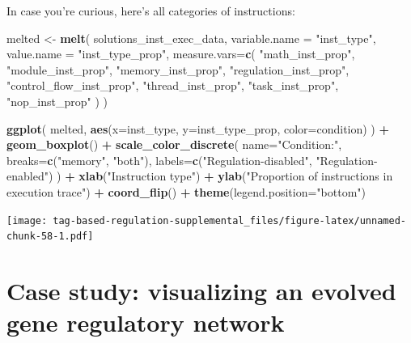 \documentclass[
]{book}
\newenvironment{Shaded}{\begin{snugshade}}{\end{snugshade}}
\newcommand{\DataTypeTok}[1]{\textcolor[rgb]{0.13,0.29,0.53}{#1}}
\newcommand{\KeywordTok}[1]{\textcolor[rgb]{0.13,0.29,0.53}{\textbf{#1}}}
\newcommand{\NormalTok}[1]{#1}
\newcommand{\OperatorTok}[1]{\textcolor[rgb]{0.81,0.36,0.00}{\textbf{#1}}}
\newcommand{\StringTok}[1]{\textcolor[rgb]{0.31,0.60,0.02}{#1}}
\begin{document}
In case you're curious, here's all categories of instructions:

\begin{Shaded}
\begin{Highlighting}[]
\NormalTok{melted \textless{}{-}}\StringTok{ }\KeywordTok{melt}\NormalTok{(}
\NormalTok{  solutions\_inst\_exec\_data,}
  \DataTypeTok{variable.name =} \StringTok{"inst\_type"}\NormalTok{,}
  \DataTypeTok{value.name =} \StringTok{"inst\_type\_prop"}\NormalTok{,}
  \DataTypeTok{measure.vars=}\KeywordTok{c}\NormalTok{(}
    \StringTok{"math\_inst\_prop"}\NormalTok{,}
    \StringTok{"module\_inst\_prop"}\NormalTok{,}
    \StringTok{"memory\_inst\_prop"}\NormalTok{,}
    \StringTok{"regulation\_inst\_prop"}\NormalTok{,}
    \StringTok{"control\_flow\_inst\_prop"}\NormalTok{,}
    \StringTok{"thread\_inst\_prop"}\NormalTok{,}
    \StringTok{"task\_inst\_prop"}\NormalTok{,}
    \StringTok{"nop\_inst\_prop"}
\NormalTok{  )}
\NormalTok{)}

\KeywordTok{ggplot}\NormalTok{( melted, }\KeywordTok{aes}\NormalTok{(}\DataTypeTok{x=}\NormalTok{inst\_type, }\DataTypeTok{y=}\NormalTok{inst\_type\_prop, }\DataTypeTok{color=}\NormalTok{condition) ) }\OperatorTok{+}
\StringTok{  }\KeywordTok{geom\_boxplot}\NormalTok{() }\OperatorTok{+}
\StringTok{  }\KeywordTok{scale\_color\_discrete}\NormalTok{(}
    \DataTypeTok{name=}\StringTok{"Condition:"}\NormalTok{,}
    \DataTypeTok{breaks=}\KeywordTok{c}\NormalTok{(}\StringTok{"memory"}\NormalTok{, }\StringTok{"both"}\NormalTok{),}
    \DataTypeTok{labels=}\KeywordTok{c}\NormalTok{(}\StringTok{"Regulation{-}disabled"}\NormalTok{, }\StringTok{"Regulation{-}enabled"}\NormalTok{)}
\NormalTok{  ) }\OperatorTok{+}
\StringTok{  }\KeywordTok{xlab}\NormalTok{(}\StringTok{"Instruction type"}\NormalTok{) }\OperatorTok{+}
\StringTok{  }\KeywordTok{ylab}\NormalTok{(}\StringTok{"Proportion of instructions in execution trace"}\NormalTok{) }\OperatorTok{+}
\StringTok{  }\KeywordTok{coord\_flip}\NormalTok{() }\OperatorTok{+}
\StringTok{  }\KeywordTok{theme}\NormalTok{(}\DataTypeTok{legend.position=}\StringTok{"bottom"}\NormalTok{)}
\end{Highlighting}
\end{Shaded}

\texttt{[image: tag-based-regulation-supplemental\_files/figure-latex/unnamed-chunk-58-1.pdf]}

\hypertarget{case-study-visualizing-an-evolved-gene-regulatory-network}{%
\section{Case study: visualizing an evolved gene regulatory network}\label{case-study-visualizing-an-evolved-gene-regulatory-network}}
\end{document}
